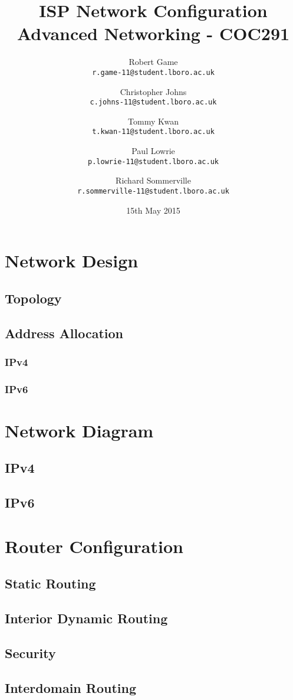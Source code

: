 \documentclass{report}
\author{
  Robert Game\\
  \texttt{r.game-11@student.lboro.ac.uk}
  \and
  Christopher Johns\\
  \texttt{c.johns-11@student.lboro.ac.uk}
  \and
  Tommy Kwan\\
  \texttt{t.kwan-11@student.lboro.ac.uk}  
  \and
  Paul Lowrie\\
  \texttt{p.lowrie-11@student.lboro.ac.uk}
  \and
  Richard Sommerville\\
  \texttt{r.sommerville-11@student.lboro.ac.uk}
}
\title{ISP Network Configuration\\ \large Advanced Networking - COC291}
\date{15th May 2015}
\begin{document}

\maketitle

\tableofcontents

\chapter{Network Design}
\section{Topology}
\section{Address Allocation}
\subsection{IPv4}
\subsection{IPv6}

\chapter{Network Diagram}
\section{IPv4}
\section{IPv6}

\chapter{Router Configuration}
\section{Static Routing}
\section{Interior Dynamic Routing}
\section{Security}
\section{Interdomain Routing}
\end{document}

